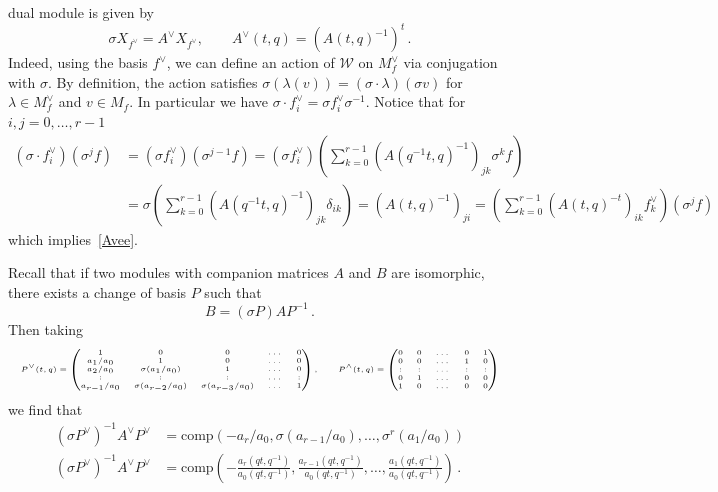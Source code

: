 \documentclass[12pt,reqno]{amsart}
\theoremstyle{definition}
\def\calW{\mathcal W}
\def\s{\sigma}
\def\be{\begin{equation}}
\def\ee{\end{equation}}
\def\comp{\mathrm{comp}}
\begin{document}
dual module is given by
\be
\label{Avee}
\s X_{f^{\vee}} = A^{\vee} X_{f^{\vee}}, \qquad
A^{\vee}(t,q) = (A(t,q)^{-1})^t \,.
\ee
Indeed, using the basis $f^{\vee}$, we can define an action of $\calW$ on
$M_{f}^{\vee}$ via conjugation with $\sigma$. By definition, the action satisfies
$\sigma(\lambda(v)) = (\sigma\cdot\lambda)(\sigma v)$ for $\lambda\in M_{f}^{\vee}$
and $v\in M_{f}$. In particular we have
$\sigma\cdot f_{i}^{\vee} = \sigma f_{i}^{\vee}\sigma^{-1}$. 
Notice that for $i,j=0,\dots,r-1$
\begin{equation*}
\begin{aligned}
(\sigma\cdot f_{i}^{\vee})(\sigma^{j}f)
&=
(\sigma f_{i}^{\vee})(\sigma^{j-1}f)
=
(\sigma f_{i}^{\vee})\left(\sum_{k=0}^{r-1}(A(q^{-1}t,q)^{-1})_{jk}\sigma^{k}f\right)
\\ &=
\sigma\left(\sum_{k=0}^{r-1}(A(q^{-1}t,q)^{-1})_{jk}\delta_{ik}\right)
= (A(t,q)^{-1})_{ji}
= \left(\sum_{k=0}^{r-1}(A(t,q)^{-t})_{ik}f^{\vee}_{k}\right)(\sigma^{j}f)
\end{aligned}
\end{equation*}
which implies~\eqref{Avee}.

Recall that if two modules with companion matrices $A$ and $B$ are isomorphic,
there exists a change of basis $P$ such that
\be
B
=
(\s P) A P^{-1} \,.
\ee
Then taking
\be
\begin{tiny}
\begin{aligned}
  P^{\vee}(t,q)
  =
  \begin{pmatrix}
    1 & 0 & 0 & \dots & 0\\
    a_{1}/a_0 & 1 & 0 & \dots & 0\\
    a_{2}/a_0 & \s(a_{1}/a_0) & 1 & \dots & 0\\
    : & : & : & \dots & :\\
    a_{r-1}/a_0 & \s(a_{r-2}/a_0) & \s(a_{r-3}/a_0) & \dots & 1\\
  \end{pmatrix}, \qquad
  P^{\wedge}(t,q)
  =
  \begin{pmatrix}
    0 & 0 & \dots & 0 & 1\\
    0 & 0 & \dots & 1 & 0\\
    : & : & \dots & : & :\\
    0 & 1 & \dots & 0 & 0\\
    1 & 0 & \dots & 0 & 0\\
  \end{pmatrix}
\end{aligned}
\end{tiny}
\ee
we find that
\be
\begin{aligned}
  (\s P^{\vee})^{-1}A^{\vee}P^{\vee}
  &=\comp(-a_r/a_0,\s(a_{r-1}/a_0), \dots, \s^{r}(a_{1}/a_0))\\
  (\s P^{\vee})^{-1}A^{\vee}P^{\vee}
  &=\comp\left(-\frac{a_r(qt,q^{-1})}{a_0(qt,q^{-1})},
    \frac{a_{r-1}(qt,q^{-1})}{a_0(qt,q^{-1})}, \dots,
    \frac{a_{1}(qt,q^{-1})}{a_0(qt,q^{-1})}\right)\,.
\end{aligned}
\ee
\end{document}
